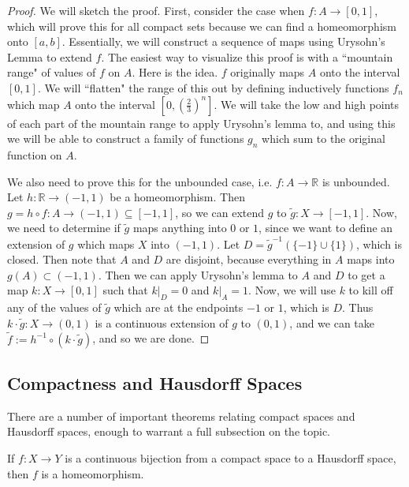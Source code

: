 	\begin{proof}
		We will sketch the proof. First, consider the case when $f : A\rightarrow [0, 1]$, which will prove this for all 
		compact sets because we can find a homeomorphism onto $[a, b]$. Essentially, we will construct a sequence 
		of maps using Urysohn's Lemma to extend $f$. The easiest way to visualize this proof is with a ``mountain 
		range" of values of $f$ on $A$. Here is the idea. $f$ originally maps $A$ onto the interval $[0, 1]$. We will 
		``flatten" the range of this out by defining inductively functions $f_n$ which map $A$ onto the interval $[0, 
		(\frac{2}{3})^n]$. We will take the low and high points of each part of the mountain range to apply Urysohn's 
		lemma to, and using this we will be able to construct a family of functions $g_n$ which sum to the original 
		function on $A$.
		
		We also need to prove this for the unbounded case, i.e. $f : A\rightarrow\mathbb R$ is unbounded. Let 
		$h : \mathbb R\rightarrow (-1, 1)$ be a homeomorphism. Then $g = h\circ f : A\rightarrow (-1, 1)\subseteq [-1, 1]$, 
		so we can extend $g$ to $\tilde g : X\rightarrow [-1, 1]$. Now, we need to determine if $\tilde g$ maps anything 
		into $0$ or $1$, since we want to define an extension of $g$ which maps $X$ into $(-1, 1)$. Let $D = 
		\tilde g^{-1}(\{-1\}\cup\{1\})$, which is closed. Then note that $A$ and $D$ are disjoint, because everything in 
		$A$ maps into $g(A)\subset (-1, 1)$. Then we can apply Urysohn's lemma to $A$ and $D$ to get a map 
		$k : X\rightarrow [0, 1]$ such that $k|_D = 0$ and $k|_A = 1$. Now, we will use $k$ to kill off any of the values 
		of $\tilde g$ which are at the endpoints $-1$ or $1$, which is $D$. Thus $k\cdot\tilde g : X\rightarrow (0, 1)$ is a 
		continuous extension of $g$ to $(0, 1)$, and we can take $\tilde f := h^{-1}\circ (k\cdot\tilde g)$, and so we are done.
	\end{proof}
	
	\subsection{Compactness and Hausdorff Spaces}
	
	There are a number of important theorems relating compact spaces and Hausdorff spaces, enough to warrant a full 
	subsection on the topic. 
	
	\begin{prop}
		If $f : X\rightarrow Y$ is a continuous bijection from a compact space to a Hausdorff space, then $f$ is a 
		homeomorphism. 
	\end{prop}
	
